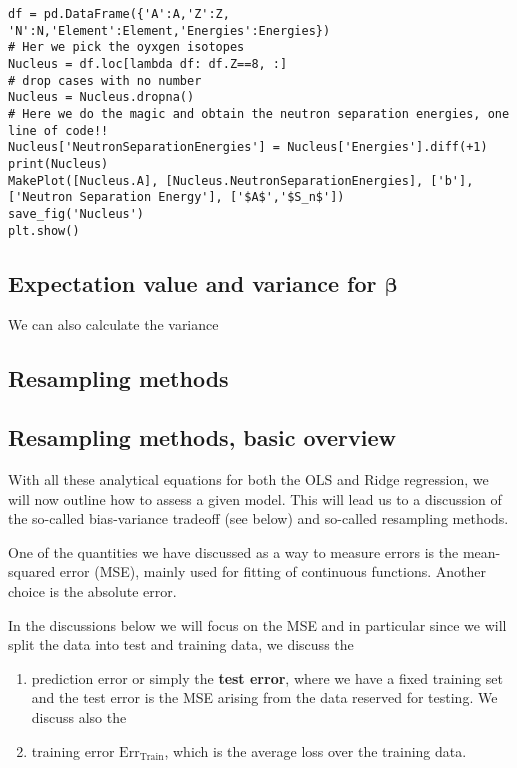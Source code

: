 \documentclass[%
oneside,                 %
final,                   %
10pt]{article}
\newenvironment{doconceexercise}{}{}
\begin{document}
\begin{doconceexercise}
\begin{verbatim}
df = pd.DataFrame({'A':A,'Z':Z, 'N':N,'Element':Element,'Energies':Energies})
# Her we pick the oyxgen isotopes
Nucleus = df.loc[lambda df: df.Z==8, :]
# drop cases with no number
Nucleus = Nucleus.dropna()
# Here we do the magic and obtain the neutron separation energies, one line of code!!
Nucleus['NeutronSeparationEnergies'] = Nucleus['Energies'].diff(+1)
print(Nucleus)
MakePlot([Nucleus.A], [Nucleus.NeutronSeparationEnergies], ['b'], ['Neutron Separation Energy'], ['$A$','$S_n$'])
save_fig('Nucleus')
plt.show()

\end{verbatim}


\end{doconceexercise}


\subsection*{Expectation value and variance for $\bm{\beta}$}


We can also calculate the variance



\subsection*{Resampling methods}

\subsection*{Resampling methods, basic overview}

With all these analytical equations for both the OLS and Ridge
regression, we will now outline how to assess a given model. This will
lead us to a discussion of the so-called bias-variance tradeoff (see
below) and so-called resampling methods.

One of the quantities we have discussed as a way to measure errors is
the mean-squared error (MSE), mainly used for fitting of continuous
functions. Another choice is the absolute error.

In the discussions below we will focus on the MSE and in particular since we will split the data into test and training data,
we discuss the
\begin{enumerate}
\item prediction error or simply the \textbf{test error}, where we have a fixed training set and the test error is the MSE arising from the data reserved for testing. We discuss also the 

\item training error $\mathrm{Err_{Train}}$, which is the average loss over the training data.
\end{enumerate}
\end{document}

